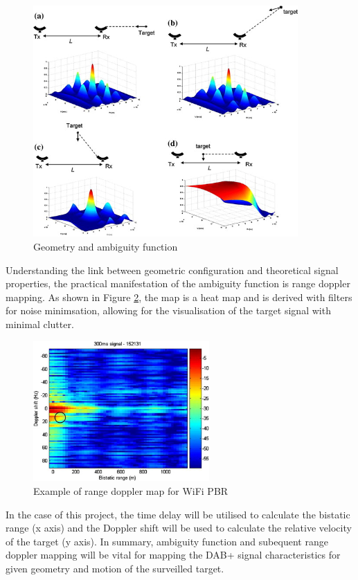 \documentclass[12pt,a4paper]{article}
\begin{document}
\begin{figure}[htbp]
    \centering
    \includegraphics[width=0.9\textwidth]{ambiguity.jpg}
    \caption{Geometry and ambiguity function \cite{FundamentalsPassiveRadar}}
    \label{fig:ambiguity}
\end{figure}
\par \vspace{0.5cm} 
\noindent Understanding the link between geometric configuration and theoretical signal properties, the practical manifestation of the ambiguity function is range doppler mapping. As shown in Figure \ref{fig:rangeDoppler}, the map is a heat map and is derived with filters for noise minimsation, allowing for the visualisation of the target signal with minimal clutter. 
\begin{figure}[htbp]
    \centering
    \includegraphics[width=0.6\textwidth]{rangeDoppler.jpg}
    \caption{Example of range doppler map for WiFi PBR \cite{FundamentalsPassiveRadar}}
    \label{fig:rangeDoppler}
\end{figure}
\par  
\noindent In the case of this project, the time delay will be utilised to calculate the bistatic range (x axis) and the Doppler shift will be used to calculate the relative velocity of the target (y axis). In summary, ambiguity function and subequent range doppler mapping will be vital for mapping the DAB+ signal characteristics for given geometry and motion of the surveilled target.
\end{document}
